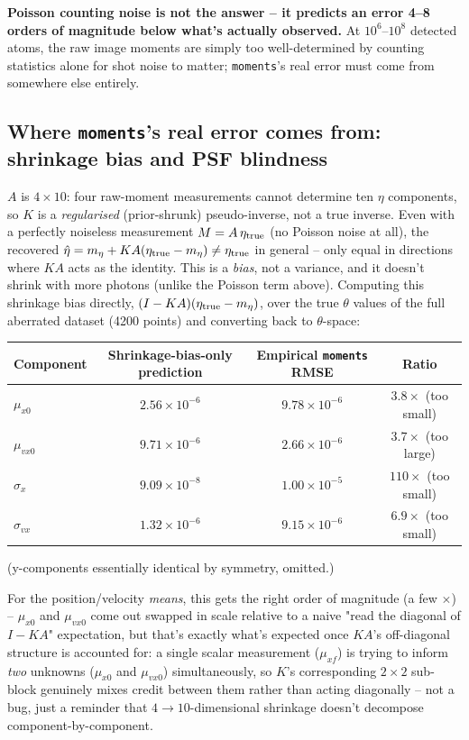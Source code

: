 \documentclass[11pt,a4paper]{article}
\newcommand{\code}[1]{\texttt{#1}}
\begin{document}
\textbf{Poisson counting noise is not the answer -- it predicts an error
4--8 orders of magnitude below what's actually observed.} At $10^6$--$10^8$
detected atoms, the raw image moments are simply too well-determined by
counting statistics alone for shot noise to matter; \code{moments}'s real
error must come from somewhere else entirely.

\subsection{Where \code{moments}'s real error comes from: shrinkage bias and PSF blindness}
\label{sec:moments-bias}

$A$ is $4\times10$: four raw-moment measurements cannot determine ten
$\eta$ components, so $K$ is a \emph{regularised} (prior-shrunk)
pseudo-inverse, not a true inverse. Even with a perfectly noiseless
measurement $M=A\,\eta_{\rm true}$ (no Poisson noise at all), the recovered
$\hat\eta = m_\eta + K A(\eta_{\rm true}-m_\eta) \neq \eta_{\rm true}$ in
general -- only equal in directions where $KA$ acts as the identity. This is
a \emph{bias}, not a variance, and it doesn't shrink with more photons
(unlike the Poisson term above). Computing this shrinkage bias directly,
$(I-KA)(\eta_{\rm true}-m_\eta)$, over the true $\theta$ values of the full
aberrated dataset (4200 points) and converting back to $\theta$-space:
\begin{center}\small
\begin{tabular}{lccc}
\toprule
Component & Shrinkage-bias-only prediction & Empirical \code{moments} RMSE & Ratio \\
\midrule
$\mu_{x0}$    & $2.56\times10^{-6}$ & $9.78\times10^{-6}$ & $3.8\times$ (too small) \\
$\mu_{vx0}$   & $9.71\times10^{-6}$ & $2.66\times10^{-6}$ & $3.7\times$ (too large) \\
$\sigma_x$    & $9.09\times10^{-8}$ & $1.00\times10^{-5}$ & $110\times$ (too small) \\
$\sigma_{vx}$ & $1.32\times10^{-6}$ & $9.15\times10^{-6}$ & $6.9\times$ (too small) \\
\bottomrule
\end{tabular}
\end{center}
(y-components essentially identical by symmetry, omitted.)

For the position/velocity \emph{means}, this gets the right order of
magnitude (a few $\times$) -- $\mu_{x0}$ and $\mu_{vx0}$ come out swapped in
scale relative to a naive "read the diagonal of $I-KA$" expectation, but
that's exactly what's expected once $KA$'s off-diagonal structure is
accounted for: a single scalar measurement ($\mu_{xf}$) is trying to inform
\emph{two} unknowns ($\mu_{x0}$ and $\mu_{vx0}$) simultaneously, so $K$'s
corresponding $2\times2$ sub-block genuinely mixes credit between them
rather than acting diagonally -- not a bug, just a reminder that
$4\to10$-dimensional shrinkage doesn't decompose component-by-component.
\end{document}

